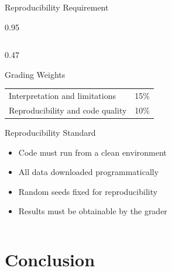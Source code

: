 \documentclass[9pt, aspectratio=169, t]{beamer}
\begin{document}
\begin{frame}{Reproducibility Requirement}
\begin{cminipage}{0.95\textwidth}
{\begin{columns}[T]
\begin{column}{0.47\textwidth}
\begin{alertblock}{Grading Weights}
{\begin{center}
\begin{tabular}{lr}
                        Interpretation and limitations & 15\% \\
                        Reproducibility and code quality & 10\% \\
                        \bottomrule
                    \end{tabular}
                \end{center}
                }
            \end{alertblock}
            \vspace{-2mm}
            \begin{exampleblock}{Reproducibility Standard}
                \begin{itemize}\setlength{\itemsep}{0pt}
                    \item Code must run from a clean environment
                    \item All data downloaded programmatically
                    \item Random seeds fixed for reproducibility
                    \item Results must be obtainable by the grader
                \end{itemize}
            \end{exampleblock}
        \end{column}
    \end{columns}
    }
    \end{cminipage}
\end{frame}

\section{Conclusion}
\end{document}
